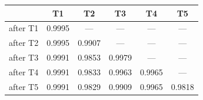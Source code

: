 \begin{tabular}{@{}lccccc@{}}
\toprule
& \textbf{T1} & \textbf{T2} & \textbf{T3} & \textbf{T4} & \textbf{T5} \\
\midrule
after T1 & 0.9995 & --- & --- & --- & --- \\
after T2 & 0.9995 & 0.9907 & --- & --- & --- \\
after T3 & 0.9991 & 0.9853 & 0.9979 & --- & --- \\
after T4 & 0.9991 & 0.9833 & 0.9963 & 0.9965 & --- \\
after T5 & 0.9991 & 0.9829 & 0.9909 & 0.9965 & 0.9818 \\
\bottomrule
\end{tabular}
